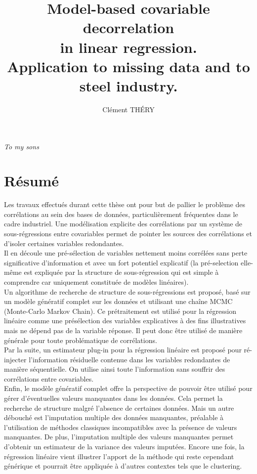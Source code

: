 \documentclass[12pt,a4paper]{report}
\author{Clément TH\'ERY}
\title{Model-based covariable decorrelation \\ in linear regression.\\ Application to missing data and to steel industry.}
\begin{document}
%	
\maketitle

\newpage
\itshape To my sons
\upshape


\chapter*{Résumé}
	Les travaux effectués durant cette thèse ont pour but de pallier le problème des corrélations au sein des bases de données, particulièrement fréquentes dans le cadre industriel. Une modélisation explicite des corrélations par un système de sous-régressions entre covariables permet de pointer les sources des corrélations et d'isoler certaines variables redondantes. 
	\\
	
	Il en découle une pré-sélection de variables nettement moins corrélées sans perte significative d'information et avec un fort potentiel explicatif (la pré-selection elle-même est expliquée par la structure de sous-régression qui est simple à comprendre car uniquement constituée de modèles linéaires). \\
	
	Un algorithme de recherche de structure de sous-régressions est proposé, basé sur un modèle génératif complet sur les données et utilisant une chaîne MCMC (Monte-Carlo Markov Chain). Ce prétraitement est utilisé pour la régression linéaire comme une présélection des variables explicatives à des fins illustratives mais ne dépend pas de la variable réponse. Il peut donc être utilisé de manière générale pour toute problématique de corrélations.\\
	
	Par la suite, un estimateur plug-in pour la régression linéaire est proposé pour ré-injecter l'information résiduelle contenue dans les variables redondantes de manière séquentielle. On utilise ainsi toute l'information sans souffrir des corrélations entre covariables.
	\\
	
	Enfin, le modèle génératif complet offre la perspective de pouvoir être utilisé pour gérer d'éventuelles valeurs manquantes dans les données. Cela permet la recherche de structure malgré l'absence de certaines données. Mais un autre débouché est l'imputation multiple des données manquantes, préalable à l'utilisation de méthodes classiques incompatibles avec la présence de valeurs manquantes. De plus, l'imputation multiple des valeurs manquantes permet d'obtenir un estimateur de la variance des valeurs imputées.
	Encore une fois, la régression linéaire vient illustrer l'apport de la méthode qui reste cependant générique et pourrait être appliquée à d'autres contextes tels que le clustering.
	\\	
	
\end{document}

